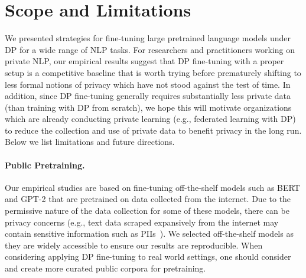
\section{Scope and Limitations}

We presented strategies for fine-tuning large pretrained language models under DP for a wide range of NLP tasks. 
For researchers and practitioners working on private NLP, our empirical results suggest that DP fine-tuning with a proper setup is a competitive baseline that is worth trying before prematurely shifting to less formal notions of privacy which have not stood against the test of time.
In addition, since DP fine-tuning generally requires substantially less private data (than training with DP from scratch), we hope this will motivate organizations which are already conducting private learning (e.g., federated learning with DP) to reduce the collection and use of private data to benefit privacy in the long run.
Below we list limitations and future directions. 

\paragraph{Public Pretraining.}
Our empirical studies are based on fine-tuning off-the-shelf models such as BERT and GPT-2 that are pretrained on data collected from the internet. 
Due to the permissive nature of the data collection for some of these models, there can be privacy concerns (e.g., text data scraped expansively from the internet may contain sensitive information such as PIIs~\citep{carlini2020extracting}).
We selected off-the-shelf models as they are widely accessible to ensure our results are reproducible.
When considering applying DP fine-tuning to real world settings, one should consider and create more curated public corpora for pretraining.




